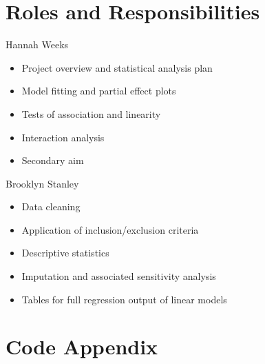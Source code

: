 \documentclass[10pt]{article}\usepackage[]{graphicx}\usepackage[]{color}
\begin{document}
\section{Roles and Responsibilities}

Hannah Weeks\\
\begin{itemize}
  \item Project overview and statistical analysis plan
  \item Model fitting and partial effect plots
  \item Tests of association and linearity
  \item Interaction analysis
  \item Secondary aim
\end{itemize}

Brooklyn Stanley\\
\begin{itemize}
  \item Data cleaning
  \item Application of inclusion/exclusion criteria
  \item Descriptive statistics
  \item Imputation and associated sensitivity analysis
  \item Tables for full regression output of linear models
\end{itemize}

\clearpage
\section{Code Appendix}
\end{document}
